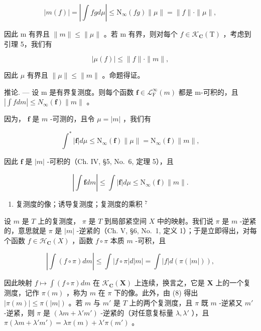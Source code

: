 \[
| m (f) | = \left| \int f g d \mu \right| \leqslant \mathrm{N} _ {\infty} (f g) \| \mu \| = \| f \| \cdot \| \mu \|,
\]

因此 m 有界且 \(\|m\|\leqslant\|\mu\|\) 。若 m 有界，则对每个 \(f\in\mathcal{K}_{\mathbf{C}}(\mathrm{T})\) ，考虑到引理 5，我们有

\[
| \mu (f) | \leqslant \| f \| \cdot \| m \|,
\]

因此 \(\mu\) 有界且 \(\| \mu \| \leqslant \| m\|\) 。命题得证。

推论. --- 设 m 是有界复测度。则每个函数 \(\mathbf{f} \in \mathcal{L}_{\mathrm{F}}^{\infty}(m)\) 都是 m-可积的，且 \(\left|\int f dm\right| \leqslant N_{\infty}(\mathbf{f}) \|m\|\) 。

因为， \(\mathbf{f}\) 是 \(m\) -可测的，且令 \(\mu = |m|\) ，我们有

\[
\int^ {*} | \mathbf {f} | d \mu \leqslant \mathrm{N} _ {\infty} (\mathbf {f}) \| \mu \| = \mathrm{N} _ {\infty} (\mathbf {f}) \| m \|,
\]

因此 \(\mathbf{f}\) 是 \(|m|\) -可积的（Ch. IV, §5, No.~6, 定理 5），且

\[
\left| \int \mathbf {f} d m \right| \leqslant \int | \mathbf {f} | d \mu \leqslant \mathrm{N} _ {\infty} (\mathbf {f}) \| m \|.
\]

\begin{enumerate}
\def\labelenumi{\arabic{enumi}.}
\setcounter{enumi}{9}
\tightlist
\item
  复测度的像；诱导复测度；复测度的乘积 \(^{7}\)
\end{enumerate}

设 \(m\) 是 \(T\) 上的复测度， \(\pi\) 是 \(T\) 到局部紧空间 \(X\) 中的映射。我们说 \(\pi\) 是 \(m\) -逆紧的，意思就是 \(\pi\) 是 \(|m|\) -逆紧的（Ch. V, §6, No.~1, 定义 1）；于是立即得出，对每个函数 \(f \in \mathcal{H}_{\mathbf{C}}(X)\) ，函数 \(f \circ \pi\) 本质 \(m\) -可积，且

\[
\left| \int (f \circ \pi) d m \right| \leqslant \int | f \circ \pi | d | m | = \int | f | d (\pi (| m |)),\tag{8}
\]

因此映射 \(f \mapsto \int (f \circ \pi) dm\) 在 \(\mathcal{K}_{\mathbf{C}}(\mathbf{X})\) 上连续，换言之，它是 \(\mathbf{X}\) 上的一个复测度，记作 \(\pi(m)\) ，称为 \(m\) 在 \(\pi\) 下的像。此外，由 (8) 得出 \(|\pi(m)| \leqslant \pi(|m|)\) 。若 \(m\) 与 \(m'\) 是 \(T\) 上的两个复测度，且 \(\pi\) 既 \(m\) -逆紧又 \(m'\) -逆紧，则 \(\pi\) 是 \((\lambda m + \lambda'm')\) -逆紧的（对任意复标量 \(\lambda, \lambda'\) ），且 \(\pi(\lambda m + \lambda'm') = \lambda\pi(m) + \lambda'\pi(m')\) 。

